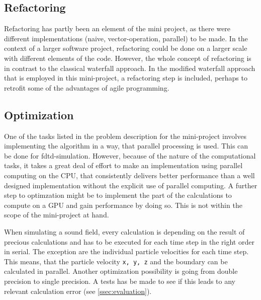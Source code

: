\subsection{Refactoring}\label{ssec:refactoring}
Refactoring has partly been an element of the mini project, as there were different implementations (naive, vector-operation, parallel) to be made. 
In the context of a larger software project, refactoring could be done on a larger scale with different elements of the code. However, the whole concept of refactoring is in contrast to the classical waterfall approach. In the modified waterfall approach that is employed in this mini-project, a refactoring step is included, perhaps to retrofit some of the advantages of agile programming.
\subsection{Optimization}\label{ssec:optimization}
One of the tasks listed in the problem description for the mini-project involves implementing the algorithm in a way, that parallel processing is used. This can be done for \gls{fdtd}-simulation. However, because of the nature of the computational tasks, it takes a great deal of effort to make an implementation using parallel computing on the CPU, that consistently delivers better performance than a well designed implementation without the explicit use of parallel computing.
A further step to optimzation might be to implement the part of the calculations to compute on a GPU and gain performance by doing so. This is not within the scope of the mini-project at hand.

When simulating a sound field, every calculation is depending on the result of precious calculations and has to be executed for each time step in the right order in serial. The exception are the individual particle velocities for each time step. This means, that the particle velocity \texttt{x, y, z} and the boundary can be calculated in parallel. Another optimization possibility is going from double precision to single precision. A tests has be made to see if this leads to any relevant calculation error (see \autoref{ssec:evaluation}).